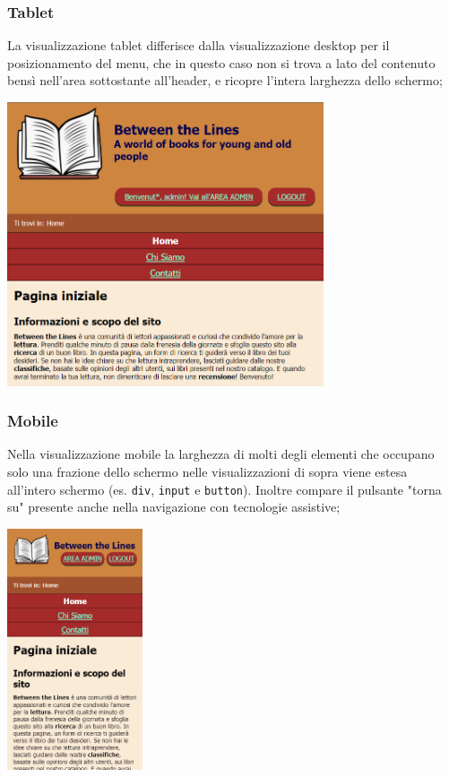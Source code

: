 \documentclass[12pt,a4paper,headings=optiontohead]{article}
\begin{document}
	\subsubsection{Tablet}
	La visualizzazione tablet differisce dalla visualizzazione desktop per il posizionamento del menu, che in questo caso non si trova a lato del contenuto bensì nell'area sottostante all'header, e ricopre l'intera larghezza dello schermo;
	\begin{center}
		\includegraphics[width=0.7\textwidth]{layout_relazione/tablet.png}
	\end{center}
	\subsubsection{Mobile}
	Nella visualizzazione mobile la larghezza di molti degli elementi che occupano solo una frazione dello schermo nelle visualizzazioni di sopra viene estesa all'intero schermo (es. \texttt{div}, \texttt{input} e \texttt{button}). Inoltre compare il pulsante "torna su" presente anche nella navigazione con tecnologie assistive;
	\begin{center}
		\includegraphics[width=0.3\textwidth]{layout_relazione/mobile.png}
	\end{center}
\end{document}
